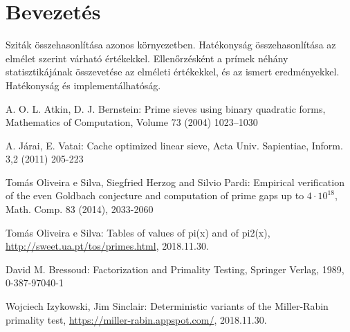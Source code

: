 \documentclass[12pt]{report}
\begin{document}
\tableofcontents

\chapter{Bevezetés}



{\color{red}
Sziták összehasonlítása azonos környezetben.
Hatékonyság összehasonlítása az elmélet szerint várható értékekkel.
Ellenőrzésként a prímek néhány statisztikájának összevetése az elméleti értékekkel,
és az ismert eredményekkel.
Hatékonyság és implementálhatóság.
}









\begin{thebibliography}{9}

A. O. L. Atkin, D. J. Bernstein: Prime sieves using binary quadratic forms, Mathematics of Computation, Volume 73 (2004) 1023–1030

A. Járai, E. Vatai: Cache optimized linear sieve, Acta Univ. Sapientiae, Inform. 3,2 (2011) 205-223

Tomás Oliveira e Silva, Siegfried Herzog and Silvio Pardi: Empirical verification of the even Goldbach conjecture and computation of prime gaps up to $4\cdot10^{18}$, Math. Comp. 83 (2014), 2033-2060

Tomás Oliveira e Silva: Tables of values of pi(x) and of pi2(x), \url{http://sweet.ua.pt/tos/primes.html}, 2018.11.30.

David M. Bressoud: Factorization and Primality Testing, Springer Verlag, 1989, 0-387-97040-1

Wojciech Izykowski, Jim Sinclair: Deterministic variants of the Miller-Rabin primality test, \url{https://miller-rabin.appspot.com/}, 2018.11.30.

\end{thebibliography}
\end{document}
